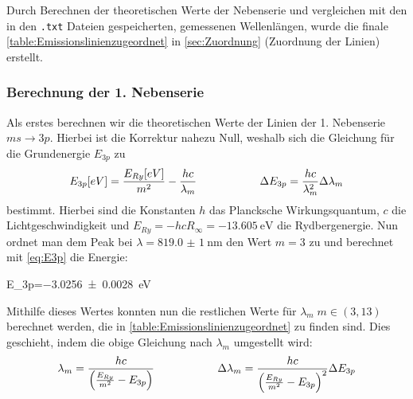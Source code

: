 Durch Berechnen der theoretischen Werte der Nebenserie und vergleichen mit den in den \verb|.txt| Dateien gespeicherten, gemessenen Wellenlängen, wurde die finale \cref{table:Emissionslinienzugeordnet} in \cref{sec:Zuordnung} (Zuordnung der Linien) erstellt. 

\subsubsection{Berechnung der 1. Nebenserie}\label{sec:BerechnungNS1}
Als erstes berechnen wir die theoretischen Werte der Linien der 1. Nebenserie \(ms\to 3p\). Hierbei ist die Korrektur nahezu Null, weshalb sich die Gleichung für die Grundenergie \(E_{3p}\) zu
\begin{equation}
\begin{array}{c@{\hspace{2cm}}c}
E_{3p}[eV] = \dfrac{E_{Ry}[eV]}{m^2} - \dfrac{hc}{\lambda_m} & \Delta E_{3p} = \dfrac{hc}{\lambda_m^2} \Delta \lambda_m
\end{array}
\label{eq:E3p}
\end{equation}
bestimmt. 
Hierbei sind die Konstanten \(h\) das Plancksche Wirkungsquantum, \(c\) die Lichtgeschwindigkeit und \(E_{Ry}=-hcR_{\infty}=\qty{-13.605}{\electronvolt}\) die Rydbergenergie. Nun ordnet man dem Peak bei \(\lambda=\qty{819.0(10)}{\nano\m}\)
den Wert \(m=3\) zu und berechnet mit \cref{eq:E3p} die Energie:
\begin{rb}
  E_{3p}=\qty{-3.0256(28)}{\electronvolt}
\end{rb}
Mithilfe dieses Wertes konnten nun die restlichen Werte für \(\lambda_m\; m\in(3,13)\) berechnet werden, die in \cref{table:Emissionslinienzugeordnet} zu finden sind. Dies geschieht, indem
die obige Gleichung nach \(\lambda_m\) umgestellt wird:
\begin{equation}
\begin{array}{c@{\hspace{2cm}}c}
\lambda_m = \dfrac{hc}{\left( \frac{E_{Ry}}{m^2} - E_{3p} \right)} & \Delta \lambda_m = \dfrac{hc}{\left( \frac{E_{Ry}}{m^2} - E_{3p} \right)^2} \Delta E_{3p}
\end{array}
\label{eq:lambdam}
\end{equation}



